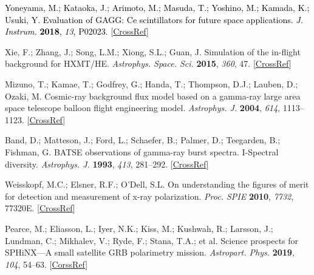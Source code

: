 \documentclass[galaxies,article,accept,moreauthors,pdftex,10pt,a4paper]{mdpi}
\begin{document}
\begin{thebibliography}{999}
\textcolor{black}{
Yoneyama, M.; Kataoka, J.; Arimoto, M.; Masuda, T.; Yoshino, M.; Kamada, K.; Usuki, Y. Evaluation of GAGG: Ce scintillators for future space applications. {\em J. Instrum.} {\bf 2018}, {\em 13}, P02023.
} [\href{http://dx.doi.org/10.1088/1748-0221/13/02/P02023}{CrossRef}]

Xie, F.; Zhang, J.; Song, L.M.; Xiong, S.L.; Guan, J. Simulation of the in-flight background for HXMT/HE. {\em Astrophys. Space. Sci.} {\bf 2015}, {\em 360}, 47. [\href{http://dx.doi.org/10.1007/s10509-015-2559-1}{CrossRef}]

Mizuno, T.; Kamae, T.; Godfrey, G.; Handa, T.; Thompson, D.J.; Lauben, D.; Ozaki, M. Cosmic-ray background flux model based on a gamma-ray large area space telescope balloon flight engineering model. {\em Astrophys. J.} {\bf 2004}, {\em 614}, 1113--1123. [\href{http://dx.doi.org/10.1086/423801}{CrossRef}]

Band, D.; Matteson, J.; Ford, L.; Schaefer, B.; Palmer, D.; Teegarden, B.; Fishman, G. BATSE observations of gamma-ray burst spectra. I-Spectral diversity. {\em Astrophys. J.} {\bf 1993}, {\em 413}, 281--292. [\href{http://dx.doi.org/10.1086/172995}{CrossRef}]

Weisskopf, M.C.; Elsner, R.F.; O'Dell, S.L. On understanding the figures of merit for detection and measurement of x-ray polarization. {\em Proc. SPIE} {\bf 2010}, {\em 7732}, 77320E. [\href{http://dx.doi.org/10.1117/12.857357}{CrossRef}]

Pearce, M.; Eliasson, L.; Iyer, N.K.; Kiss, M.; Kushwah, R.; Larsson, J.; Lundman, C.; Mikhalev, V.; Ryde, F.; Stana, T.A.; et al. Science prospects for SPHiNX---A small satellite GRB polarimetry mission. {\em Astropart. Phys.} {\bf 2019}, {\em 104}, 54--63. [\href{http://dx.doi.org/10.1016/j.astropartphys.2018.08.007}{CorssRef}]

\end{thebibliography}

\end{document}

